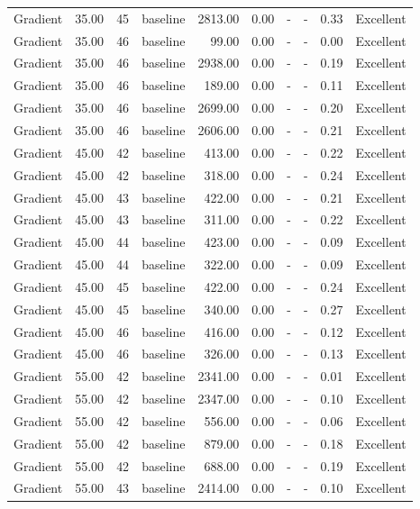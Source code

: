 \begin{table}[htbp]
\begin{tabular}{lrrlrrrrrl}
Gradient & 35.00 & 45 & baseline & 2813.00 & 0.00 & - & - & 0.33 & Excellent \\
Gradient & 35.00 & 46 & baseline & 99.00 & 0.00 & - & - & 0.00 & Excellent \\
Gradient & 35.00 & 46 & baseline & 2938.00 & 0.00 & - & - & 0.19 & Excellent \\
Gradient & 35.00 & 46 & baseline & 189.00 & 0.00 & - & - & 0.11 & Excellent \\
Gradient & 35.00 & 46 & baseline & 2699.00 & 0.00 & - & - & 0.20 & Excellent \\
Gradient & 35.00 & 46 & baseline & 2606.00 & 0.00 & - & - & 0.21 & Excellent \\
Gradient & 45.00 & 42 & baseline & 413.00 & 0.00 & - & - & 0.22 & Excellent \\
Gradient & 45.00 & 42 & baseline & 318.00 & 0.00 & - & - & 0.24 & Excellent \\
Gradient & 45.00 & 43 & baseline & 422.00 & 0.00 & - & - & 0.21 & Excellent \\
Gradient & 45.00 & 43 & baseline & 311.00 & 0.00 & - & - & 0.22 & Excellent \\
Gradient & 45.00 & 44 & baseline & 423.00 & 0.00 & - & - & 0.09 & Excellent \\
Gradient & 45.00 & 44 & baseline & 322.00 & 0.00 & - & - & 0.09 & Excellent \\
Gradient & 45.00 & 45 & baseline & 422.00 & 0.00 & - & - & 0.24 & Excellent \\
Gradient & 45.00 & 45 & baseline & 340.00 & 0.00 & - & - & 0.27 & Excellent \\
Gradient & 45.00 & 46 & baseline & 416.00 & 0.00 & - & - & 0.12 & Excellent \\
Gradient & 45.00 & 46 & baseline & 326.00 & 0.00 & - & - & 0.13 & Excellent \\
Gradient & 55.00 & 42 & baseline & 2341.00 & 0.00 & - & - & 0.01 & Excellent \\
Gradient & 55.00 & 42 & baseline & 2347.00 & 0.00 & - & - & 0.10 & Excellent \\
Gradient & 55.00 & 42 & baseline & 556.00 & 0.00 & - & - & 0.06 & Excellent \\
Gradient & 55.00 & 42 & baseline & 879.00 & 0.00 & - & - & 0.18 & Excellent \\
Gradient & 55.00 & 42 & baseline & 688.00 & 0.00 & - & - & 0.19 & Excellent \\
Gradient & 55.00 & 43 & baseline & 2414.00 & 0.00 & - & - & 0.10 & Excellent \\

\end{tabular}
\end{table}
